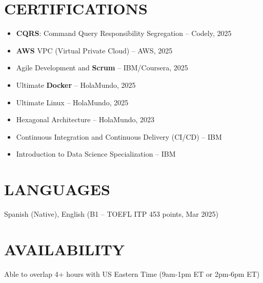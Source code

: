 \documentclass[a4paper,10pt]{article}
\newcommand{\kw}[1]{\textbf{\textcolor{keyword}{#1}}}
\newcommand{\tech}[1]{\textbf{\textcolor{tech}{#1}}}
\begin{document}
\section*{CERTIFICATIONS}
\begin{itemize}[noitemsep, leftmargin=*]
    \item \kw{CQRS}: Command Query Responsibility Segregation -- Codely, 2025
    \item \tech{AWS} VPC (Virtual Private Cloud) -- AWS, 2025
    \item Agile Development and \kw{Scrum} -- IBM/Coursera, 2025
    \item Ultimate \tech{Docker} -- HolaMundo, 2025
    \item Ultimate Linux -- HolaMundo, 2025
    \item Hexagonal Architecture -- HolaMundo, 2023
    \item Continuous Integration and Continuous Delivery (CI/CD) -- IBM
    \item Introduction to Data Science Specialization -- IBM
\end{itemize}

\section*{LANGUAGES}
Spanish (Native), English (B1 -- TOEFL ITP 453 points, Mar 2025)

\section*{AVAILABILITY}
Able to overlap 4+ hours with US Eastern Time (9am-1pm ET or 2pm-6pm ET)
\end{document}
